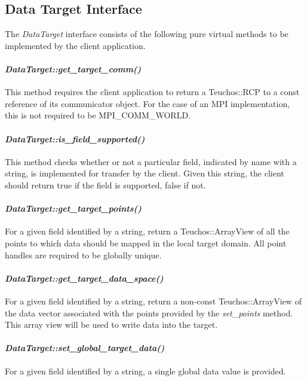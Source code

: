 \documentclass[letterpaper]{article}
\begin{document}
\subsection{Data Target Interface}
The {\sl DataTarget} interface consists of the following pure
virtual methods to be implemented by the client application.

\paragraph{\sl DataTarget::get\_target\_comm()}
This method requires the client application to return a Teuchos::RCP
to a const reference of its communicator object. For the case of an
MPI implementation, this is not required to be MPI\_COMM\_WORLD.

\paragraph{\sl DataTarget::is\_field\_supported()}
This method checks whether or not a particular field, indicated by
name with a string, is implemented for transfer by the client. Given
this string, the client should return true if the field is supported,
false if not.

\paragraph{\sl DataTarget::get\_target\_points()}
For a given field identified by a string, return a Teuchos::ArrayView
of all the points to which data should be mapped in the local target
domain. All point handles are required to be globally unique.

\paragraph{\sl DataTarget::get\_target\_data\_space()}
For a given field identified by a string, return a non-const
Teuchos::ArrayView of the data vector associated with the points
provided by the {\sl set\_points} method. This array view will be used
to write data into the target.

\paragraph{\sl DataTarget::set\_global\_target\_data()}
For a given field identified by a string, a single global data value
is provided.
\end{document}
